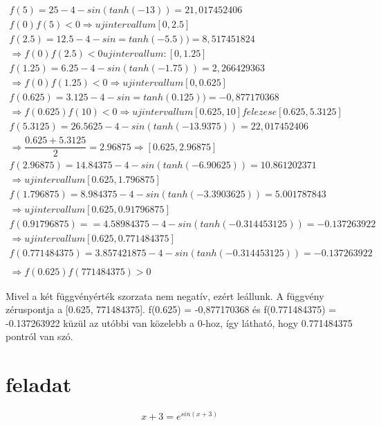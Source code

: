 \documentclass{article}
\begin{document}
\begin{multline}
\\
f(5) = 25-4-sin(tanh(-13)) = 21,017452406 \\
f(0)f(5) < 0 \Rightarrow uj intervallum [0,2.5] \\
f(2.5) = 12.5-4-sin=tanh(-5.5)) = 8,517451824 \\
\Rightarrow f(0)f(2.5) < 0 uj intervallum: [0, 1.25] \\
f(1.25) = 6.25-4-sin(tanh(-1.75)) = 2,266429363 \\
\Rightarrow f(0)f(1.25) < 0 \Rightarrow uj intervallum [0, 0.625] \\
f(0.625) = 3.125-4-sin=tanh(0.125)) = -0,877170368 \\
\Rightarrow f(0.625)f(10) < 0 \Rightarrow ujintervallum [0.625,10] felezese [0.625,5.3125]\\
f(5.3125) = 26.5625-4-sin(tanh(-13.9375)) = 22,017452406 \\
\Rightarrow \dfrac{0.625+5.3125}{2} = 2.96875 \Rightarrow [0.625, 2.96875] \\
f(2.96875) = 14.84375 - 4 - sin(tanh(-6.90625)) = 10.861202371 \\
\Rightarrow uj intervallum [0.625, 1.796875] \\
f(1.796875) = 8.984375-4-sin(tanh(-3.3903625)) = 5.001787843 \\
\Rightarrow uj intervallum [0.625, 0.91796875] \\
f(0.91796875) = = 4.58984375 - 4 -sin(tanh(-0.314453125)) = -0.137263922\\
\Rightarrow uj intervallum [0.625, 0.771484375]\\
f(0.771484375) = 3.857421875 - 4 -sin(tanh(-0.314453125)) = -0.137263922\\
\\
\Rightarrow f(0.625)f(771484375)>0
\end{multline}

Mivel a két függvényérték szorzata nem negatív, ezért leállunk. A függvény zéruspontja a [0.625, 771484375]. f(0.625) = -0,877170368 és f(0.771484375) = -0.137263922 küzül az utóbbi van közelebb a 0-hoz, így látható, hogy 0.771484375 pontról van szó.

\section{feladat}

\begin{equation}
x+3= e^{sin(x+3)}
\end{equation}
\end{document}

